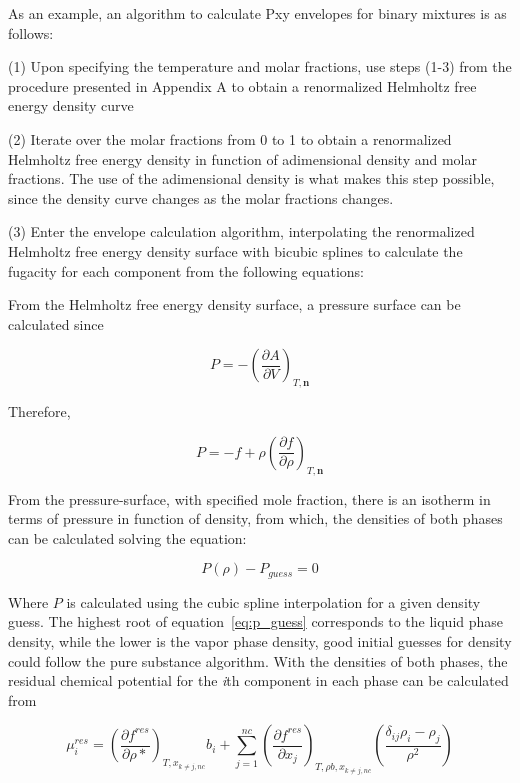 \documentclass[preprint,12pt,3p]{elsarticle}
\begin{document}
\begin{appendices}
As an example, an algorithm to calculate Pxy envelopes for binary mixtures is as follows:

(1) Upon specifying the temperature and molar fractions, use steps (1-3) from the procedure presented in Appendix A to obtain a renormalized Helmholtz free energy density curve

(2) Iterate over the molar fractions from 0 to 1 to obtain a renormalized Helmholtz free energy density in function of adimensional density and molar fractions.
The use of the adimensional density is what makes this step possible, since the density curve changes as the molar fractions changes.

(3) Enter the envelope calculation algorithm, interpolating the renormalized Helmholtz free energy density surface with bicubic splines to calculate the fugacity for each component from the following equations:

From the Helmholtz free energy density surface, a pressure surface can be calculated since

\begin{equation} \label{eq:press_helm_deriv}
P = -\left(\frac{\partial A}{\partial V}\right)_{T,\textbf{n}}
\end{equation}

Therefore,

\begin{equation} \label{eq:press_helm_deriv2}
P = -f+\rho\left(\frac{\partial f}{\partial \rho}\right)_{T,\textbf{n}}
\end{equation}

From the pressure-surface, with specified mole fraction, there is an isotherm in terms of pressure in function of density, from which, the densities of both phases can be calculated solving the equation:

\begin{equation} \label{eq:p_guess}
P(\rho) - P_{guess} = 0
\end{equation}

Where $P$ is calculated using the cubic spline interpolation for a given density guess.
The highest root of equation~\ref{eq:p_guess} corresponds to the liquid phase density, while the lower is the vapor phase density, good initial guesses for density could follow the pure substance algorithm.
With the densities of both phases, the residual chemical potential for the \textit{i}th component in each phase can be calculated from

\begin{equation} \label{eq:chem_pot_i}
\mu_{i}^{res} = \left(\frac{\partial f^{res}}{\partial \rho{*}}\right)_{T,x_{k\neq j,nc}}b_{i}+\sum_{j=1}^{nc} \left(\frac{\partial f^{res}}{\partial x_{j}}\right)_{T,\rho b,x_{k\neq j,nc}} \left(\frac{\delta_{ij} \rho_{i}-\rho_{j}}{\rho^{2}}\right)
\end{equation} 


\end{appendices}
\end{document}

